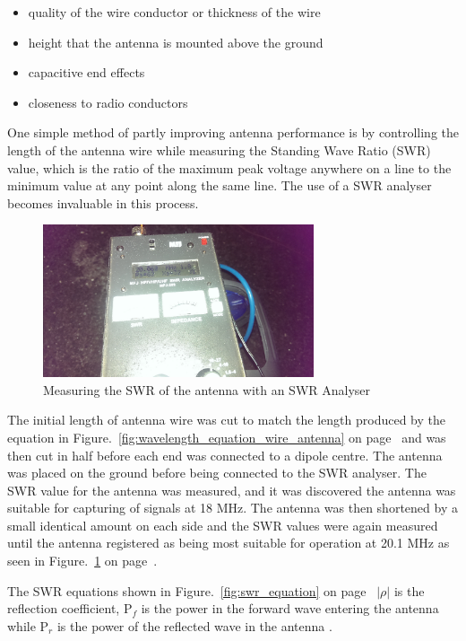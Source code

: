 \begin{itemize}
	\item quality of the wire conductor or thickness of the wire
	\item height that the antenna is mounted above the ground
	\item capacitive end effects
	\item closeness to radio conductors
\end{itemize}

One simple method of partly improving antenna performance is by controlling the length of the antenna wire while measuring the Standing Wave Ratio (\gls{SWR}) value, which is the ratio of the maximum peak voltage anywhere on a line to the minimum value at any point along the same line. The use of a \gls{SWR} analyser becomes invaluable in this process.

%
\begin{figure}[here]
\centering
\includegraphics[width=8cm]{images/34}
\caption{Measuring the SWR of the antenna with an SWR Analyser}
\label{fig:swr_analyser_measuring_antenna}
\end{figure}
%

The initial length of antenna wire was cut to match the length produced by the equation in Figure.~\ref{fig:wavelength_equation_wire_antenna} on page~\pageref{fig:wavelength_equation_wire_antenna} and was then cut in half before each end was connected to a dipole centre. The antenna was placed on the ground before being connected to the \gls{SWR} analyser. The \gls{SWR} value for the antenna was measured, and it was discovered the antenna was suitable for capturing of signals at 18 MHz. The antenna was then shortened by a small identical amount on each side and the \gls{SWR} values were again measured until the antenna registered as being most suitable for operation at 20.1 MHz as seen in Figure.~\ref{fig:swr_analyser_measuring_antenna} on page~\pageref{fig:swr_analyser_measuring_antenna}. 

The \gls{SWR} equations shown in Figure.~\ref{fig:swr_equation} on page~\pageref{fig:swr_equation} $|\rho|$ is the reflection coefficient, P$_{f}$ is the power in the forward wave entering the antenna while P$_{r}$ is the power of the reflected wave in the antenna \citep{arrl-00}.

